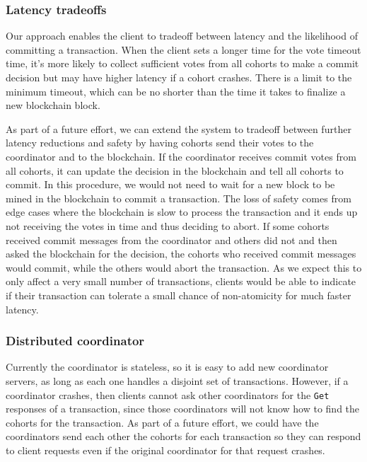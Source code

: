 \documentclass[11pt,conference]{IEEEtran}
\begin{document}
\subsubsection{Latency tradeoffs}
Our approach enables the client to tradeoff between latency and the likelihood of committing a transaction. When the client sets a longer time for the vote timeout time, it’s more likely to collect sufficient votes from all cohorts to make a commit decision but may have higher latency if a cohort crashes. There is a limit to the minimum timeout, which can be no shorter than the time it takes to finalize a new blockchain block.

As part of a future effort, we can extend the system to tradeoff between further latency reductions and safety by having cohorts send their votes to the coordinator and to the blockchain. If the coordinator receives commit votes from all cohorts, it can update the decision in the blockchain and tell all cohorts to commit. In this procedure, we would not need to wait for a new block to be mined in the blockchain to commit a transaction. The loss of safety comes from edge cases where the blockchain is slow to process the transaction and it ends up not receiving the votes in time and thus deciding to abort. If some cohorts received commit messages from the coordinator and others did not and then asked the blockchain for the decision, the cohorts who received commit messages would commit, while the others would abort the transaction. As we expect this to only affect a very small number of transactions, clients would be able to indicate if their transaction can tolerate a small chance of non-atomicity for much faster latency.

\subsubsection{Distributed coordinator}
Currently the coordinator is stateless, so it is easy to add new coordinator servers, as long as each one handles a disjoint set of transactions. However, if a coordinator crashes, then clients cannot ask other coordinators for the \texttt{Get} responses of a transaction, since those coordinators will not know how to find the cohorts for the transaction. As part of a future effort, we could have the coordinators send each other the cohorts for each transaction so they can respond to client requests even if the original coordinator for that request crashes.



\end{document}
